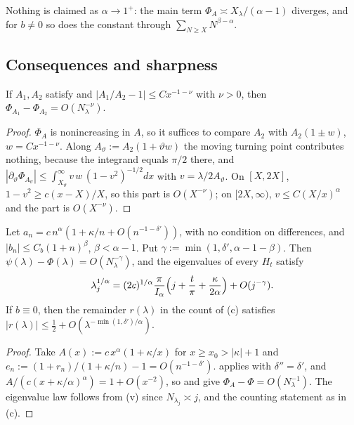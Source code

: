 Nothing is claimed as $\alpha\to1^+$: the main term $\Phi_A\asymp X_\lambda/(\alpha-1)$ diverges, and for
$b\ne0$ so does the constant through $\sum_{N\ge X}N^{\beta-\alpha}$.

\subsection{Consequences and sharpness}

\begin{lemma}\label{lem:M}
If $A_1,A_2$ satisfy  and $|A_1/A_2-1|\le Cx^{-1-\nu}$ with $\nu>0$, then
$\Phi_{A_1}-\Phi_{A_2}=O(N_\lambda^{-\nu})$.
\end{lemma}

\begin{proof}
$\Phi_A$ is nonincreasing in $A$, so it suffices to compare $A_2$ with $A_2(1\pm w)$,
$w=Cx^{-1-\nu}$. Along $A_\vartheta:=A_2(1+\vartheta w)$ the moving turning point contributes
nothing, because the integrand equals $\pi/2$ there, and
$|\partial_\vartheta\Phi_{A_\vartheta}|\le\int_{X_\vartheta}^\infty v\,w\,(1-v^2)^{-1/2}dx$ with $v=\lambda/2A_\vartheta$.
On $[X,2X]$, $1-v^2\ge c(x-X)/X$, so this part is $O(X^{-\nu})$; on $[2X,\infty)$,
$v\le C(X/x)^\alpha$ and the part is $O(X^{-\nu})$.
\end{proof}

\begin{corollary}\label{cor:rate}
Let $a_n=c\,n^\alpha(1+\kappa/n+O(n^{-1-\delta'}))$, with no condition on differences, and
$|b_n|\le C_b(1+n)^\beta$, $\beta<\alpha-1$. Put $\gamma:=\min(1,\delta',\alpha-1-\beta)$. Then
$\psi(\lambda)-\Phi(\lambda)=O(N_\lambda^{-\gamma})$, and the eigenvalues of every $H_t$ satisfy
\[
  \lambda_j^{1/\alpha}=(2c)^{1/\alpha}\frac{\pi}{I_\alpha}\Bigl(j+\frac t\pi+\frac{\kappa}{2\alpha}\Bigr)+O(j^{-\gamma}).
\]
If $b\equiv0$, then the remainder $r(\lambda)$ in the count of (c) satisfies
$|r(\lambda)|\le\frac12+O(\lambda^{-\min(1,\delta')/\alpha})$.
\end{corollary}

\begin{proof}
Take $A(x):=c\,x^\alpha(1+\kappa/x)$ for $x\ge x_0>|\kappa|+1$ and
$e_n:=(1+r_n)/(1+\kappa/n)-1=O(n^{-1-\delta'})$.  applies with $\delta''=\delta'$, and
$A/(c(x+\kappa/\alpha)^\alpha)=1+O(x^{-2})$, so  and  give
$\Phi_A-\Phi=O(N_\lambda^{-1})$. The eigenvalue law follows from (v) since
$N_{\lambda_j}\asymp j$, and the counting statement as in (c).
\end{proof}

